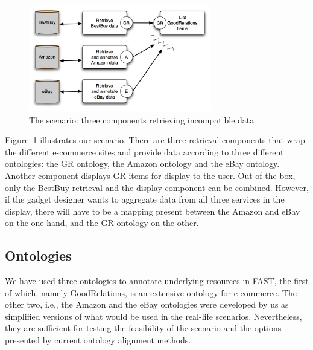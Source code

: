 \begin{figure}
    \centering
        \includegraphics[width=8cm]{images/screens_diagram.png}%
        \caption{The scenario: three components retrieving incompatible data}
    \label{fig:screens}
\end{figure}

Figure~\ref{fig:screens} illustrates our scenario. There are three retrieval components that wrap the different e-commerce sites and provide data according to three different ontologies: the GR ontology, the Amazon ontology and the eBay ontology. Another component displays GR items for display to the user. Out of the box, only the BestBuy retrieval and the display component can be combined. However, if the gadget designer wants to aggregate data from all three services in the display, there will have to be a mapping present between the Amazon and eBay on the one hand, and the GR ontology on the other.



\subsection{Ontologies}
\label{ontologies}
We have used three ontologies to annotate underlying resources in FAST, the first of which, namely GoodRelations, is an extensive ontology for e-commerce. The other two, i.e., the Amazon and the eBay ontologies were developed by us as simplified versions of what would be used in the real-life scenarios. Nevertheless, they are sufficient for testing the feasibility of the scenario and the options presented by current ontology alignment methods.

